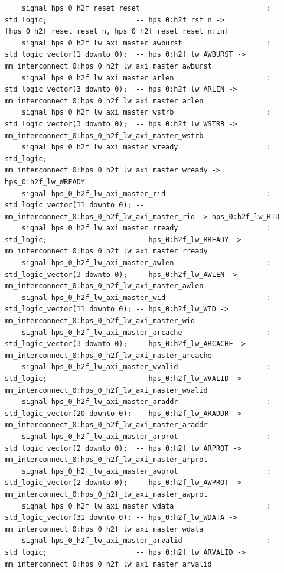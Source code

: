 \documentclass[conference]{IEEEtran}
\begin{document}
\begin{lstlisting}
	signal hps_0_h2f_reset_reset                              : std_logic;                     -- hps_0:h2f_rst_n -> [hps_0_h2f_reset_reset_n, hps_0_h2f_reset_reset_n:in]
	signal hps_0_h2f_lw_axi_master_awburst                    : std_logic_vector(1 downto 0);  -- hps_0:h2f_lw_AWBURST -> mm_interconnect_0:hps_0_h2f_lw_axi_master_awburst
	signal hps_0_h2f_lw_axi_master_arlen                      : std_logic_vector(3 downto 0);  -- hps_0:h2f_lw_ARLEN -> mm_interconnect_0:hps_0_h2f_lw_axi_master_arlen
	signal hps_0_h2f_lw_axi_master_wstrb                      : std_logic_vector(3 downto 0);  -- hps_0:h2f_lw_WSTRB -> mm_interconnect_0:hps_0_h2f_lw_axi_master_wstrb
	signal hps_0_h2f_lw_axi_master_wready                     : std_logic;                     -- mm_interconnect_0:hps_0_h2f_lw_axi_master_wready -> hps_0:h2f_lw_WREADY
	signal hps_0_h2f_lw_axi_master_rid                        : std_logic_vector(11 downto 0); -- mm_interconnect_0:hps_0_h2f_lw_axi_master_rid -> hps_0:h2f_lw_RID
	signal hps_0_h2f_lw_axi_master_rready                     : std_logic;                     -- hps_0:h2f_lw_RREADY -> mm_interconnect_0:hps_0_h2f_lw_axi_master_rready
	signal hps_0_h2f_lw_axi_master_awlen                      : std_logic_vector(3 downto 0);  -- hps_0:h2f_lw_AWLEN -> mm_interconnect_0:hps_0_h2f_lw_axi_master_awlen
	signal hps_0_h2f_lw_axi_master_wid                        : std_logic_vector(11 downto 0); -- hps_0:h2f_lw_WID -> mm_interconnect_0:hps_0_h2f_lw_axi_master_wid
	signal hps_0_h2f_lw_axi_master_arcache                    : std_logic_vector(3 downto 0);  -- hps_0:h2f_lw_ARCACHE -> mm_interconnect_0:hps_0_h2f_lw_axi_master_arcache
	signal hps_0_h2f_lw_axi_master_wvalid                     : std_logic;                     -- hps_0:h2f_lw_WVALID -> mm_interconnect_0:hps_0_h2f_lw_axi_master_wvalid
	signal hps_0_h2f_lw_axi_master_araddr                     : std_logic_vector(20 downto 0); -- hps_0:h2f_lw_ARADDR -> mm_interconnect_0:hps_0_h2f_lw_axi_master_araddr
	signal hps_0_h2f_lw_axi_master_arprot                     : std_logic_vector(2 downto 0);  -- hps_0:h2f_lw_ARPROT -> mm_interconnect_0:hps_0_h2f_lw_axi_master_arprot
	signal hps_0_h2f_lw_axi_master_awprot                     : std_logic_vector(2 downto 0);  -- hps_0:h2f_lw_AWPROT -> mm_interconnect_0:hps_0_h2f_lw_axi_master_awprot
	signal hps_0_h2f_lw_axi_master_wdata                      : std_logic_vector(31 downto 0); -- hps_0:h2f_lw_WDATA -> mm_interconnect_0:hps_0_h2f_lw_axi_master_wdata
	signal hps_0_h2f_lw_axi_master_arvalid                    : std_logic;                     -- hps_0:h2f_lw_ARVALID -> mm_interconnect_0:hps_0_h2f_lw_axi_master_arvalid

\end{lstlisting}
\end{document}
